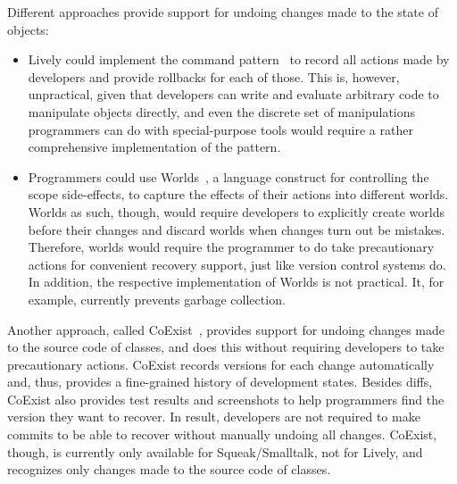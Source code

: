 Different approaches provide support for undoing changes made to the state of objects:
\begin{itemize}
    \item Lively could implement the command pattern~\cite{GammaHelmJohnsonVlissides95} to record all actions made by developers and provide rollbacks for each of those. This is, however, unpractical, given that developers can write and evaluate arbitrary code to manipulate objects directly, and even the discrete set of manipulations programmers can do with special-purpose tools would require a rather comprehensive implementation of the pattern.
    \item Programmers could use Worlds~\cite{Warth2011Wor}, a language construct for controlling the scope side-effects, to capture the effects of their actions into different worlds. Worlds as such, though, would require developers to explicitly create worlds before their changes and discard worlds when changes turn out be mistakes. Therefore, worlds would require the programmer to do take precautionary actions for convenient recovery support, just like version control systems do. In addition, the respective implementation of Worlds is not practical. It, for example, currently prevents garbage collection.
\end{itemize}

Another approach, called CoExist~\cite{Steinert2012COE}, provides support for undoing changes made to the source code of classes, and does this without requiring developers to take precautionary actions.
CoExist records versions for each change automatically and, thus, provides a fine-grained history of development states.
Besides diffs, CoExist also provides test results and screenshots to help programmers find the version they want to recover.
In result, developers are not required to make commits to be able to recover without manually undoing all changes.
CoExist, though, is currently only available for Squeak/Smalltalk, not for Lively, and recognizes only changes made to the source code of classes.

